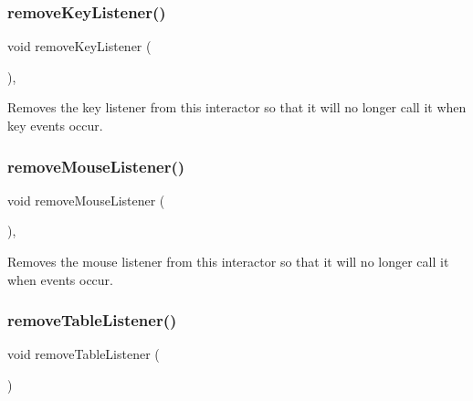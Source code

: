 \mbox{\label{classGInteractor_a43095f41cab3be732b49f29970484b05}} 
\subsubsection{\texorpdfstring{remove\+Key\+Listener()}{removeKeyListener()}}
{\footnotesize\ttfamily void remove\+Key\+Listener (\begin{DoxyParamCaption}{ }\end{DoxyParamCaption})\hspace{0.3cm}{\ttfamily [virtual]}, {\ttfamily [inherited]}}



Removes the key listener from this interactor so that it will no longer call it when key events occur. 

\mbox{\label{classGInteractor_aff47f71ce47e688a07c9d38dc92fcc11}} 
\subsubsection{\texorpdfstring{remove\+Mouse\+Listener()}{removeMouseListener()}}
{\footnotesize\ttfamily void remove\+Mouse\+Listener (\begin{DoxyParamCaption}{ }\end{DoxyParamCaption})\hspace{0.3cm}{\ttfamily [virtual]}, {\ttfamily [inherited]}}



Removes the mouse listener from this interactor so that it will no longer call it when events occur. 

\mbox{\label{classGTable_a5c18bacaf370f9c3da545f5c6e6e9515}} 
\subsubsection{\texorpdfstring{remove\+Table\+Listener()}{removeTableListener()}}
{\footnotesize\ttfamily void remove\+Table\+Listener (\begin{DoxyParamCaption}{ }\end{DoxyParamCaption})\hspace{0.3cm}{\ttfamily [virtual]}}



